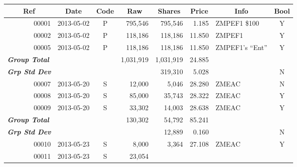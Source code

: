\documentclass{article}
\begin{document}
\begin{center}
\begin{small}
\begin{longtable}{rlcrrrlc}
\multicolumn{1}{c}{\bfseries{}Ref}&
\multicolumn{1}{c}{\bfseries{}Date}&
\bfseries{}Code&
\multicolumn{1}{c}{\bfseries{}Raw}&
\multicolumn{1}{c}{\bfseries{}Shares}&
\multicolumn{1}{c}{\bfseries{}Price}&
\multicolumn{1}{c}{\bfseries{}Info}&
\bfseries{}Bool\\
\endhead
\color{Goldenrod1}00001&
2013-05-02&
P&
\color{Goldenrod1}795,546&
\color{Goldenrod1}795,546&
\color{Goldenrod1}1.185&
ZMPEF1 \$100&
\color{green}Y\\
\color{Goldenrod1}00002&
2013-05-02&
P&
\color{Goldenrod1}118,186&
\color{Goldenrod1}118,186&
\color{Goldenrod1}11.850&
ZMPEF1&
\color{green}Y\\
\color{Goldenrod1}00005&
2013-05-02&
P&
\color{Goldenrod1}118,186&
\color{Goldenrod1}118,186&
\color{Goldenrod1}11.850&
ZMPEF1's ``Ent''&
\color{green}Y\\
\multicolumn{1}{l}{\bfseries{}\itshape{}\color{Tomato1}Group Total}&
&
&
\color{Goldenrod1}1,031,919&
\color{Goldenrod1}1,031,919&
\color{Goldenrod1}24.885&
&
\\
\multicolumn{1}{l}{\bfseries{}\itshape{}\color{Tomato1}Grp Std Dev}&
&
&
&
\color{Goldenrod1}319,310&
\color{Goldenrod1}5.028&
&
\color{red}N\\
\color{Goldenrod1}00007&
2013-05-20&
S&
\color{Goldenrod1}12,000&
\color{Goldenrod1}5,046&
\color{Goldenrod1}28.280&
ZMEAC&
\color{red}N\\
\color{Goldenrod1}00008&
2013-05-20&
S&
\color{Goldenrod1}85,000&
\color{Goldenrod1}35,743&
\color{Goldenrod1}28.322&
ZMEAC&
\color{green}Y\\
\color{Goldenrod1}00009&
2013-05-20&
S&
\color{Goldenrod1}33,302&
\color{Goldenrod1}14,003&
\color{Goldenrod1}28.638&
ZMEAC&
\color{green}Y\\
\multicolumn{1}{l}{\bfseries{}\itshape{}\color{Tomato1}Group Total}&
&
&
\color{Goldenrod1}130,302&
\color{Goldenrod1}54,792&
\color{Goldenrod1}85.241&
&
\\
\multicolumn{1}{l}{\bfseries{}\itshape{}\color{Tomato1}Grp Std Dev}&
&
&
&
\color{Goldenrod1}12,889&
\color{Goldenrod1}0.160&
&
\color{red}N\\
\color{Goldenrod1}00010&
2013-05-23&
S&
\color{Goldenrod1}8,000&
\color{Goldenrod1}3,364&
\color{Goldenrod1}27.108&
ZMEAC&
\color{green}Y\\
\color{Goldenrod1}00011&
2013-05-23&
S&
\color{Goldenrod1}23,054&

\end{longtable}
\end{small}
\end{center}
\end{document}
